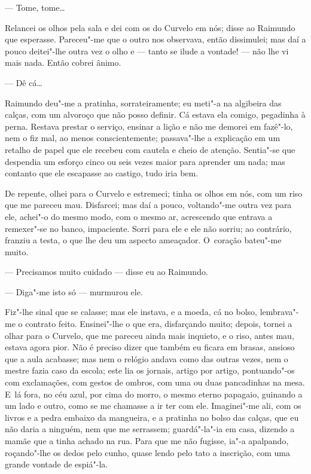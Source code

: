 \begin{linenumbers}
--- Tome, tome\ldots{}

Relancei os olhos pela sala e dei com os do Curvelo em nós; disse ao
Raimundo que esperasse. Pareceu"-me que o outro nos observava, então
dissimulei; mas daí a pouco deitei"-lhe outra vez o olho e --- tanto se
ilude a vontade! --- não lhe vi mais nada. Então cobrei ânimo.

--- Dê cá\ldots{}

Raimundo deu"-me a pratinha, sorrateiramente; eu meti"-a na algibeira das
calças, com um alvoroço que não posso definir. Cá estava ela comigo,
pegadinha à perna. Restava prestar o serviço, ensinar a lição e não me
demorei em fazê"-lo, nem o fiz mal, ao menos conscientemente; passava"-lhe
a explicação em um retalho de papel que ele recebeu com cautela e cheio
de atenção. Sentia"-se que despendia um esforço cinco ou seis vezes maior
para aprender um nada; mas contanto que ele escapasse ao castigo, tudo
iria bem.

De repente, olhei para o Curvelo e estremeci; tinha os olhos em nós, com
um riso que me pareceu mau. Disfarcei; mas daí a pouco, voltando"-me
outra vez para ele, achei"-o do mesmo modo, com o mesmo ar, acrescendo
que entrava a remexer"-se no banco, impaciente. Sorri para ele e ele não
sorriu; ao contrário, franziu a testa, o que lhe deu um aspecto
ameaçador. O~coração bateu"-me muito.

--- Precisamos muito cuidado --- disse eu ao Raimundo.

--- Diga"-me isto só --- murmurou ele.

Fiz"-lhe sinal que se calasse; mas ele instava, e a moeda, cá no bolso,
lembrava"-me o contrato feito. Ensinei"-lhe o que era, disfarçando muito;
depois, tornei a olhar para o Curvelo, que me pareceu ainda mais
inquieto, e o riso, antes mau, estava agora pior. Não é preciso dizer
que também eu ficara em brasas, ansioso que a aula acabasse; mas nem o
relógio andava como das outras vezes, nem o mestre fazia caso da escola;
este lia os jornais, artigo por artigo, pontuando"-os com exclamações,
com gestos de ombros, com uma ou duas pancadinhas na mesa. E~lá fora, no
céu azul, por cima do morro, o mesmo eterno papagaio, guinando a um lado
e outro, como se me chamasse a ir ter com ele. Imaginei"-me ali, com os
livros e a pedra embaixo da mangueira, e a pratinha no bolso das calças,
que eu não daria a ninguém, nem que me serrassem; guardá"-la"-ia em casa,
dizendo a mamãe que a tinha achado na rua. Para que me não fugisse, ia"-a
apalpando, roçando"-lhe os dedos pelo cunho, quase lendo pelo tato a
inscrição, com uma grande vontade de espiá"-la.


\end{linenumbers}
